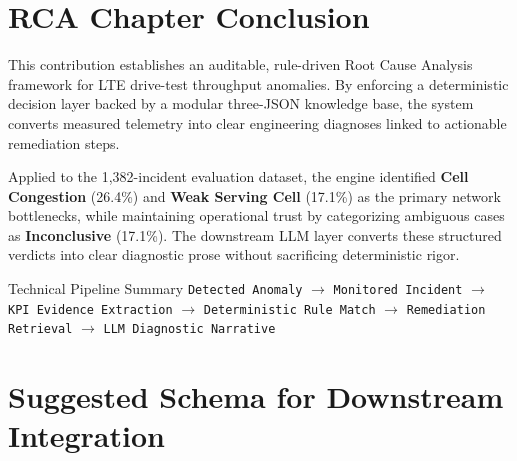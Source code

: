 \section{RCA Chapter Conclusion}

This contribution establishes an auditable, rule-driven Root Cause Analysis framework for LTE drive-test throughput anomalies. By enforcing a deterministic decision layer backed by a modular three-JSON knowledge base, the system converts measured telemetry into clear engineering diagnoses linked to actionable remediation steps.

Applied to the 1,382-incident evaluation dataset, the engine identified \textbf{Cell Congestion} (26.4\%) and \textbf{Weak Serving Cell} (17.1\%) as the primary network bottlenecks, while maintaining operational trust by categorizing ambiguous cases as \textbf{Inconclusive} (17.1\%). The downstream LLM layer converts these structured verdicts into clear diagnostic prose without sacrificing deterministic rigor.

\begin{successbox}{Technical Pipeline Summary}
\centering
\texttt{Detected Anomaly}
$\rightarrow$
\texttt{Monitored Incident}
$\rightarrow$
\texttt{KPI Evidence Extraction}
$\rightarrow$
\texttt{Deterministic Rule Match}
$\rightarrow$
\texttt{Remediation Retrieval}
$\rightarrow$
\texttt{LLM Diagnostic Narrative}
\end{successbox}

\section{Suggested Schema for Downstream Integration}

